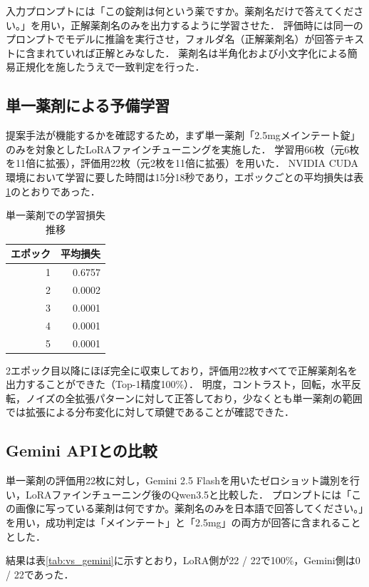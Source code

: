 \documentclass{jsarticle}
\begin{document}
入力プロンプトには「この錠剤は何という薬ですか。薬剤名だけで答えてください。」を用い，正解薬剤名のみを出力するように学習させた．
評価時には同一のプロンプトでモデルに推論を実行させ，フォルダ名（正解薬剤名）が回答テキストに含まれていれば正解とみなした．
薬剤名は半角化および小文字化による簡易正規化を施したうえで一致判定を行った．

\subsection{単一薬剤による予備学習}

提案手法が機能するかを確認するため，まず単一薬剤「2.5mgメインテート錠」のみを対象としたLoRAファインチューニングを実施した．
学習用66枚（元6枚を11倍に拡張），評価用22枚（元2枚を11倍に拡張）を用いた．
NVIDIA CUDA環境において学習に要した時間は15分18秒であり，エポックごとの平均損失は表\ref{tab:loss_meinte}のとおりであった．

\begin{table}[h]
\centering
\caption{単一薬剤での学習損失推移}
\label{tab:loss_meinte}
\begin{tabular}{rr}
\hline
エポック & 平均損失 \\
\hline
1 & 0.6757 \\
2 & 0.0002 \\
3 & 0.0001 \\
4 & 0.0001 \\
5 & 0.0001 \\
\hline
\end{tabular}
\end{table}

2エポック目以降にほぼ完全に収束しており，評価用22枚すべてで正解薬剤名を出力することができた（Top-1精度100\%）．
明度，コントラスト，回転，水平反転，ノイズの全拡張パターンに対して正答しており，少なくとも単一薬剤の範囲では拡張による分布変化に対して頑健であることが確認できた．

\subsection{Gemini APIとの比較}

単一薬剤の評価用22枚に対し，Gemini 2.5 Flashを用いたゼロショット識別を行い，LoRAファインチューニング後のQwen3.5と比較した．
プロンプトには「この画像に写っている薬剤は何ですか。薬剤名のみを日本語で回答してください。」を用い，成功判定は「メインテート」と「2.5mg」の両方が回答に含まれることとした．

結果は表\ref{tab:vs_gemini}に示すとおり，LoRA側が22 / 22で100\%，Gemini側は0 / 22であった．
\end{document}
